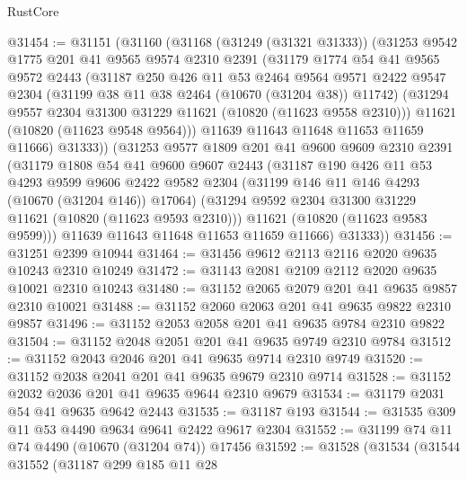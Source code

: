 \begin{lexlean}{RustCore}
\begin{coremodule}
@31454 := @31151
    (@31160
      (@31168
        (@31249 (@31321 @31333))
        (@31253
          @9542
          @1775
          @201
          @41
          @9565
          @9574
          @2310
          @2391
          (@31179
            @1774
            @54
            @41
            @9565
            @9572
            @2443
            (@31187
              @250
              @426
              @11
              @53
              @2464
              @9564
              @9571
              @2422
              @9547
              @2304
              (@31199 @38 @11 @38 @2464 (@10670 (@31204 @38)) @11742)
              (@31294 @9557 @2304 @31300 @31229 @11621 (@10820 (@11623 @9558 @2310)))
              @11621
              (@10820 (@11623 @9548 @9564)))
            @11639
            @11643
            @11648
            @11653
            @11659
            @11666)
          @31333))
      (@31253
        @9577
        @1809
        @201
        @41
        @9600
        @9609
        @2310
        @2391
        (@31179
          @1808
          @54
          @41
          @9600
          @9607
          @2443
          (@31187
            @190
            @426
            @11
            @53
            @4293
            @9599
            @9606
            @2422
            @9582
            @2304
            (@31199 @146 @11 @146 @4293 (@10670 (@31204 @146)) @17064)
            (@31294 @9592 @2304 @31300 @31229 @11621 (@10820 (@11623 @9593 @2310)))
            @11621
            (@10820 (@11623 @9583 @9599)))
          @11639
          @11643
          @11648
          @11653
          @11659
          @11666)
        @31333))
@31456 := @31251 @2399 @10944
@31464 := @31456 @9612 @2113 @2116 @2020 @9635 @10243 @2310 @10249
@31472 := @31143 @2081 @2109 @2112 @2020 @9635 @10021 @2310 @10243
@31480 := @31152 @2065 @2079 @201 @41 @9635 @9857 @2310 @10021
@31488 := @31152 @2060 @2063 @201 @41 @9635 @9822 @2310 @9857
@31496 := @31152 @2053 @2058 @201 @41 @9635 @9784 @2310 @9822
@31504 := @31152 @2048 @2051 @201 @41 @9635 @9749 @2310 @9784
@31512 := @31152 @2043 @2046 @201 @41 @9635 @9714 @2310 @9749
@31520 := @31152 @2038 @2041 @201 @41 @9635 @9679 @2310 @9714
@31528 := @31152 @2032 @2036 @201 @41 @9635 @9644 @2310 @9679
@31534 := @31179 @2031 @54 @41 @9635 @9642 @2443
@31535 := @31187 @193
@31544 := @31535 @309 @11 @53 @4490 @9634 @9641 @2422 @9617 @2304
@31552 := @31199 @74 @11 @74 @4490 (@10670 (@31204 @74)) @17456
@31592 := @31528
    (@31534
      (@31544
        @31552
        (@31187
          @299
          @185
          @11
          @28

\end{coremodule}
\end{lexlean}
